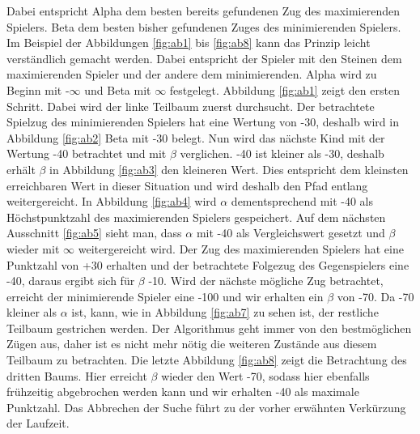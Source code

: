Dabei entspricht Alpha dem besten bereits gefundenen Zug des maximierenden Spielers. Beta dem besten bisher gefundenen Zuges des minimierenden Spielers. Im Beispiel der Abbildungen \ref{fig:ab1} bis \ref{fig:ab8} kann das Prinzip leicht verständlich gemacht werden. Dabei entspricht der Spieler mit den Steinen dem maximierenden Spieler und der andere dem minimierenden. Alpha wird zu Beginn mit -$\infty$ und Beta mit $\infty$  festgelegt. Abbildung \ref{fig:ab1} zeigt den ersten Schritt. Dabei wird der linke Teilbaum zuerst durchsucht. Der betrachtete Spielzug des minimierenden Spielers hat eine Wertung von -30, deshalb wird in Abbildung \ref{fig:ab2} Beta mit -30 belegt. Nun wird das nächste Kind mit der Wertung -40 betrachtet und mit $\beta$ verglichen. -40 ist kleiner als -30, deshalb erhält $\beta$ in Abbildung \ref{fig:ab3} den kleineren Wert. Dies entspricht dem kleinsten erreichbaren Wert in dieser Situation und wird deshalb den Pfad entlang weitergereicht. In Abbildung \ref{fig:ab4} wird $\alpha$ dementsprechend mit -40 als Höchstpunktzahl des maximierenden Spielers gespeichert. Auf dem nächsten Ausschnitt \ref{fig:ab5} sieht man, dass $\alpha$ mit -40 als Vergleichswert gesetzt und $\beta$ wieder mit $\infty$ weitergereicht wird. Der Zug des maximierenden Spielers hat eine Punktzahl von +30 erhalten und der betrachtete Folgezug des Gegenspielers eine -40, daraus ergibt sich für $\beta$ -10. Wird der nächste mögliche Zug betrachtet, erreicht der minimierende Spieler eine -100 und wir erhalten ein $\beta$ von -70. Da -70 kleiner als $\alpha$ ist, kann, wie in Abbildung \ref{fig:ab7} zu sehen ist, der restliche Teilbaum gestrichen werden. Der Algorithmus geht immer von den bestmöglichen Zügen aus, daher ist es nicht mehr nötig die weiteren Zustände aus diesem Teilbaum zu betrachten. Die letzte Abbildung \ref{fig:ab8} zeigt die Betrachtung des dritten Baums. Hier erreicht $\beta$ wieder den Wert -70, sodass hier ebenfalls frühzeitig abgebrochen werden kann und wir erhalten -40 als maximale Punktzahl.
Das Abbrechen der Suche führt zu der vorher erwähnten Verkürzung der Laufzeit.



